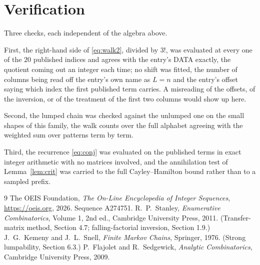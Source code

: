 \documentclass[11pt,a4paper]{article}
\theoremstyle{plain}
\theoremstyle{definition}
\begin{document}
\section{Verification}

Three checks, each independent of the algebra above.

First, the right-hand side of \eqref{eq:walk2}, divided by $3!$, was evaluated at every
one of the $20$ published indices and agrees with the entry's DATA exactly, the quotient
coming out an integer each time; no shift was fitted, the number of columns being read off the
entry's own name as $L=n$ and the entry's offset saying which index the first published
term carries. A misreading of the offsets, of the inversion, or of the treatment of the first
two columns would show up here.

Second, the lumped chain was checked against the unlumped one on the small shapes of this
family, the walk counts over the full alphabet agreeing with the weighted sum over patterns
term by term.

Third, the recurrence \eqref{eq:conj} was evaluated on the published terms in exact integer
arithmetic with no matrices involved, and the annihilation test of Lemma~\ref{lem:crit} was
carried to the full Cayley--Hamilton bound rather than to a sampled prefix.

\begin{thebibliography}{9}
 The OEIS Foundation, \emph{The On-Line Encyclopedia of Integer
Sequences}, \url{https://oeis.org}, 2026. Sequence A274751.
 R.~P.~Stanley, \emph{Enumerative Combinatorics}, Volume 1, 2nd ed.,
Cambridge University Press, 2011. (Transfer-matrix method, Section 4.7; falling-factorial
inversion, Section 1.9.)
 J.~G.~Kemeny and J.~L.~Snell, \emph{Finite Markov Chains}, Springer,
1976. (Strong lumpability, Section 6.3.)
 P.~Flajolet and R.~Sedgewick, \emph{Analytic Combinatorics}, Cambridge
University Press, 2009.
\end{thebibliography}
\end{document}
